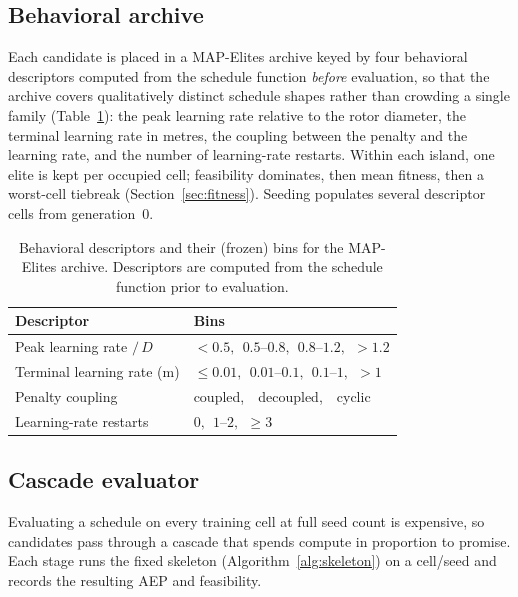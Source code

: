 \documentclass[11pt]{article}
\begin{document}
\subsection{Behavioral archive}
\label{sec:archive}
Each candidate is placed in a MAP-Elites archive keyed by four behavioral descriptors
computed from the schedule function \emph{before} evaluation, so that the archive
covers qualitatively distinct schedule shapes rather than crowding a single family
(Table~\ref{tab:bins}): the peak learning rate relative to the rotor diameter, the
terminal learning rate in metres, the coupling between the penalty and the learning
rate, and the number of learning-rate restarts. Within each island, one elite is kept
per occupied cell; feasibility dominates, then mean fitness, then a worst-cell
tiebreak (Section~\ref{sec:fitness}). Seeding populates several descriptor cells from
generation~0.

\begin{table}[t]
\centering
\small
\caption{Behavioral descriptors and their (frozen) bins for the MAP-Elites archive.
Descriptors are computed from the schedule function prior to evaluation.}
\label{tab:bins}
\begin{tabular}{@{}ll@{}}
\toprule
Descriptor & Bins \\
\midrule
Peak learning rate $/\,D$ & $<0.5,\ \ 0.5\text{--}0.8,\ \ 0.8\text{--}1.2,\ \ {>}1.2$ \\
Terminal learning rate (m) & $\le 0.01,\ \ 0.01\text{--}0.1,\ \ 0.1\text{--}1,\ \ {>}1$ \\
Penalty coupling & coupled,\ \ decoupled,\ \ cyclic \\
Learning-rate restarts & $0,\ \ 1\text{--}2,\ \ \ge 3$ \\
\bottomrule
\end{tabular}
\end{table}

\subsection{Cascade evaluator}
\label{sec:cascade}
Evaluating a schedule on every training cell at full seed count is expensive, so
candidates pass through a cascade that spends compute in proportion to promise. Each
stage runs the fixed skeleton (Algorithm~\ref{alg:skeleton}) on a cell/seed and
records the resulting AEP and feasibility.
\end{document}
